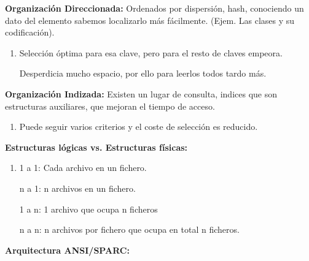 \documentclass[12pt, twoside, openright]{report} %
\begin{document}
\begin{enumerate}
    
    \textbf{Organización Direccionada:} Ordenados por dispersión, hash,
    conociendo un dato del elemento sabemos localizarlo más fácilmente.
    (Ejem. Las clases y su codificación).
    

    \begin{enumerate}
    \item Selección óptima para esa clave, pero para el resto de claves
      empeora.
      

      
      Desperdicia mucho espacio, por ello para leerlos todos tardo más.
      
    \end{enumerate}

    
    \textbf{Organización Indizada:} Existen un lugar de consulta,
    indices que son estructuras auxiliares, que mejoran el tiempo de
    acceso.
    

    \begin{enumerate}
    \item Puede seguir varios criterios y el coste de selección es reducido.
      
    \end{enumerate}
  \end{enumerate}

  \textbf{Estructuras lógicas vs. Estructuras físicas:}

  \begin{enumerate}
  \item 1 a 1: Cada archivo en un fichero.
    

    
    n a 1: n archivos en un fichero.
    

    
    1 a n: 1 archivo que ocupa n ficheros
    

    
    n a n: n archivos por fichero que ocupa en total n ficheros.
    
  \end{enumerate}

  \textbf{Arquitectura ANSI/SPARC:}
\end{document}
